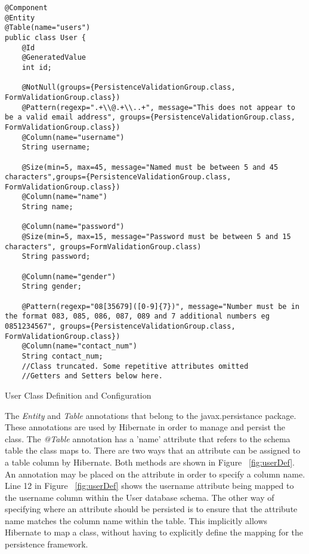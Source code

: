 \begin{table}[H]
\begin{lstlisting}
@Component
@Entity
@Table(name="users")
public class User {
	@Id
	@GeneratedValue
	int id;
	
	@NotNull(groups={PersistenceValidationGroup.class, FormValidationGroup.class})
	@Pattern(regexp=".+\\@.+\\..+", message="This does not appear to be a valid email address", groups={PersistenceValidationGroup.class, FormValidationGroup.class})
	@Column(name="username")
	String username;
	
	@Size(min=5, max=45, message="Named must be between 5 and 45 characters",groups={PersistenceValidationGroup.class, FormValidationGroup.class})
	@Column(name="name")
	String name;
	
	@Column(name="password")
	@Size(min=5, max=15, message="Password must be between 5 and 15 characters", groups=FormValidationGroup.class)
	String password;
	
	@Column(name="gender")
	String gender;
	
	@Pattern(regexp="08[35679]([0-9]{7})", message="Number must be in the format 083, 085, 086, 087, 089 and 7 additional numbers eg 0851234567", groups={PersistenceValidationGroup.class, FormValidationGroup.class})
	@Column(name="contact_num")
	String contact_num;
	//Class truncated. Some repetitive attributes omitted
	//Getters and Setters below here.
\end{lstlisting}
\caption{User Class Definition and Configuration}
\label{fig:userDef}
\end{table}

The \textit{Entity} and \textit{Table} annotations that belong to the javax.persistance package. These annotations are used by Hibernate in order to manage and persist the class. The \textit{@Table} annotation has a 'name' attribute that refers to the schema table the class maps to. There are two ways that an attribute can be assigned to a table column by Hibernate. Both methods are shown in Figure ~\ref{fig:userDef}. An annotation may be placed on the attribute in order to specify a column name. Line 12 in Figure ~\ref{fig:userDef} shows the username attribute being mapped to the username column within the User database schema. The other way of specifying where an attribute should be persisted is to ensure that the attribute name matches the column name within the table. This implicitly allows Hibernate to map a class, without having to explicitly define the mapping for the persistence framework.

